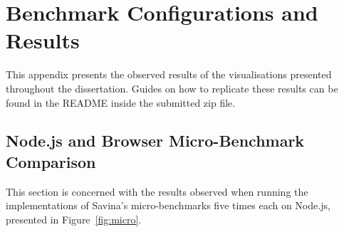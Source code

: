 \documentclass[oneside]{um-fict}
\begin{document}
\chapter{Benchmark Configurations and Results}\label{appendix:results}
This appendix presents the observed results of the visualisations presented throughout the dissertation. Guides on how to replicate these results can be found in the README inside the submitted zip file.

\section{Node.js and Browser Micro-Benchmark Comparison}\label{section:microcomparison}
This section is concerned with the results observed when running the implementations of Savina's micro-benchmarks five times each on Node.js, presented in Figure~\ref{fig:micro}.
\end{document}
